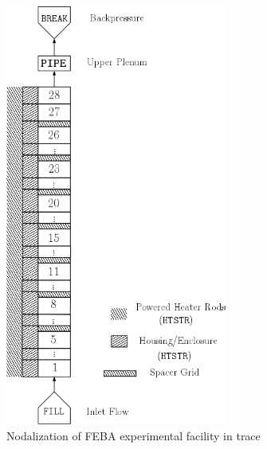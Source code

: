 \begin{figure}[bth]
    \centering
    \includegraphics[width=0.65\textwidth]{../figures/febaNodalization/febaNodalization.png}
    \caption[ nodalization of ]{Nodalization of FEBA experimental facility in \gls{trace}}
    \label{fig:feba_nodalization}
\end{figure}